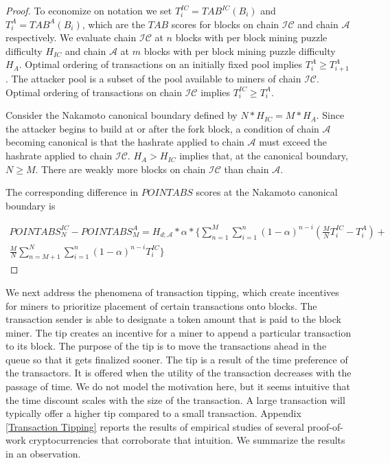 \documentclass[11pt]{article}
\theoremstyle{plain}
\begin{document}
\begin{proof}
To economize on notation we set $T_{i}^{IC} =  TAB^{IC}(B_{i})$ and $T_{i}^{A} =  TAB^{A}(B_{i})$, which are the $TAB$ scores for blocks on chain $\mathcal{IC}$ and chain $\mathcal{A}$ respectively. We evaluate chain $\mathcal{IC}$ at $n$ blocks with per block mining puzzle difficulty $H_{IC}$ and chain $\mathcal{A}$ at $m$ blocks with per block mining puzzle difficulty $H_{A}$. Optimal ordering of transactions on an initially fixed pool implies $T_{i}^{A} \geq T_{i+1}^{A}$. The attacker pool is a subset of the pool available to miners of chain $\mathcal{IC}$. Optimal ordering of transactions on chain $\mathcal{IC}$ implies $T_{i}^{IC} \geq T_{i}^{A}$. 

Consider the Nakamoto canonical boundary defined by $N*H_{IC} = M*H_{A}$. Since the attacker begins to build at or after the fork block, a condition of chain $\mathcal{A}$ becoming canonical is that the hashrate applied to chain $\mathcal{A}$ must exceed the hashrate applied to chain $\mathcal{IC}$. $H_{A} > H_{IC}$ implies that, at the canonical boundary, $N \geq M$. There are weakly more blocks on chain $\mathcal{IC}$ than chain $\mathcal{A}$. 

The corresponding difference in $POINTABS$ scores at the Nakamoto canonical boundary is

\begin{multline}
\label{eq: $POINTABS$ difference at the Nakamoto canonical boundary}
POINTABS_{N}^{IC}  - POINTABS_{M}^{A} = H_{d;\mathcal{A}}*\alpha*\big\{\sum_{n=1}^{M}\sum_{i=1}^{n}(1-\alpha)^{n-i}(\frac{M}{N} T_{i}^{IC} - T_{i}^{A}) +\\
\frac{M}{N}\sum_{n = M + 1}^{N}\sum_{i=1}^{n} (1-\alpha)^{n-i}T_{i}^{IC}\big\}
\end{multline}




\end{proof}





We next address the phenomena of transaction tipping, which create incentives for miners to prioritize placement of certain transactions onto blocks. The transaction sender is able to designate a token amount that is paid to the block miner. The tip creates an incentive for a miner to append a particular transaction to its block. The purpose of the tip is to move the transactions ahead in the queue so that it gets finalized sooner. The tip is a result of the time preference of the transactors. It is offered when the utility of the transaction decreases with the passage of time. We do not model the motivation here, but it seems intuitive that the time discount scales with the size of the transaction. A large transaction will typically offer a higher tip compared to a small transaction. Appendix \ref{Transaction Tipping} reports the results of empirical studies of several proof-of-work cryptocurrencies that corroborate that intuition. We summarize the results in an observation.
\end{document}
